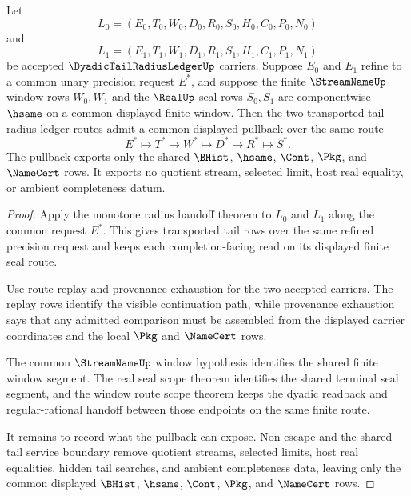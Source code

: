 \begin{theorem}
\label{thm:dyadic-tail-radius-ledger-common-refinement-pullback}
Let
$$
L_0=(E_0,T_0,W_0,D_0,R_0,S_0,H_0,C_0,P_0,N_0)
$$
and
$$
L_1=(E_1,T_1,W_1,D_1,R_1,S_1,H_1,C_1,P_1,N_1)
$$
be accepted $\DyadicTailRadiusLedgerUp$ carriers. Suppose $E_0$ and $E_1$ refine to a common unary precision request $E^\ast$, and suppose the finite $\StreamNameUp$ window rows $W_0,W_1$ and the $\RealUp$ seal rows $S_0,S_1$ are componentwise $\hsame$ on a common displayed finite window. Then the two transported tail-radius ledger routes admit a common displayed pullback over the same route
$$
E^\ast \longmapsto T^\ast \longmapsto W^\ast \longmapsto D^\ast \longmapsto R^\ast \longmapsto S^\ast.
$$
The pullback exports only the shared $\BHist$, $\hsame$, $\Cont$, $\Pkg$, and $\NameCert$ rows. It exports no quotient stream, selected limit, host real equality, or ambient completeness datum.
\end{theorem}
\begin{proof}
Apply the monotone radius handoff theorem to $L_0$ and $L_1$ along the common request $E^\ast$. This gives transported tail rows over the same refined precision request and keeps each completion-facing read on its displayed finite seal route.

Use route replay and provenance exhaustion for the two accepted carriers. The replay rows identify the visible continuation path, while provenance exhaustion says that any admitted comparison must be assembled from the displayed carrier coordinates and the local $\Pkg$ and $\NameCert$ rows.

The common $\StreamNameUp$ window hypothesis identifies the shared finite window segment. The real seal scope theorem identifies the shared terminal seal segment, and the window route scope theorem keeps the dyadic readback and regular-rational handoff between those endpoints on the same finite route.

It remains to record what the pullback can expose. Non-escape and the shared-tail service boundary remove quotient streams, selected limits, host real equalities, hidden tail searches, and ambient completeness data, leaving only the common displayed $\BHist$, $\hsame$, $\Cont$, $\Pkg$, and $\NameCert$ rows.
\end{proof}

